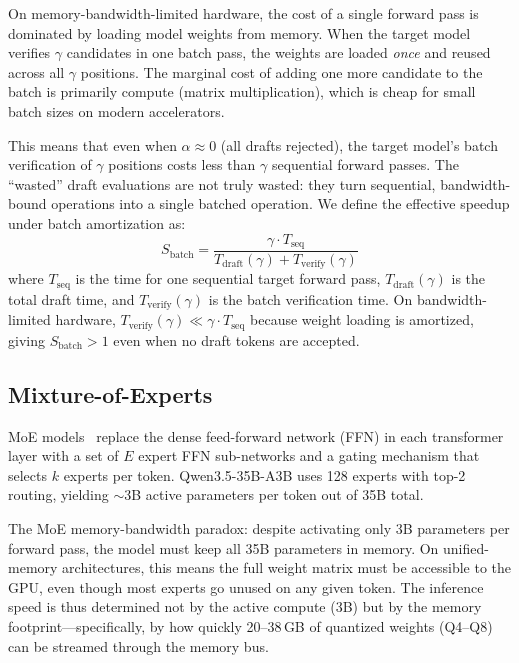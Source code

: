 \documentclass[11pt,a4paper]{article}
\begin{document}
On memory-bandwidth-limited hardware, the cost of a single forward pass is dominated by loading model weights from memory. When the target model verifies $\gamma$ candidates in one batch pass, the weights are loaded \emph{once} and reused across all $\gamma$ positions. The marginal cost of adding one more candidate to the batch is primarily compute (matrix multiplication), which is cheap for small batch sizes on modern accelerators.

This means that even when $\alpha \approx 0$ (all drafts rejected), the target model's batch verification of $\gamma$ positions costs less than $\gamma$ sequential forward passes. The ``wasted'' draft evaluations are not truly wasted: they turn sequential, bandwidth-bound operations into a single batched operation. We define the effective speedup under batch amortization as:
\begin{equation}
  S_{\text{batch}} = \frac{\gamma \cdot T_{\text{seq}}}{T_{\text{draft}}(\gamma) + T_{\text{verify}}(\gamma)}
  \label{eq:batch}
\end{equation}
where $T_{\text{seq}}$ is the time for one sequential target forward pass, $T_{\text{draft}}(\gamma)$ is the total draft time, and $T_{\text{verify}}(\gamma)$ is the batch verification time. On bandwidth-limited hardware, $T_{\text{verify}}(\gamma) \ll \gamma \cdot T_{\text{seq}}$ because weight loading is amortized, giving $S_{\text{batch}} > 1$ even when no draft tokens are accepted.

\subsection{Mixture-of-Experts}

MoE models~\cite{shazeer2017outrageously, fedus2022switch} replace the dense feed-forward network (FFN) in each transformer layer with a set of $E$ expert FFN sub-networks and a gating mechanism that selects $k$ experts per token. Qwen3.5-35B-A3B uses 128 experts with top-2 routing, yielding $\sim$3B active parameters per token out of 35B total.

The MoE memory-bandwidth paradox: despite activating only 3B parameters per forward pass, the model must keep all 35B parameters in memory. On unified-memory architectures, this means the full weight matrix must be accessible to the GPU, even though most experts go unused on any given token. The inference speed is thus determined not by the active compute (3B) but by the memory footprint---specifically, by how quickly 20--38\,GB of quantized weights (Q4--Q8) can be streamed through the memory bus.
\end{document}
